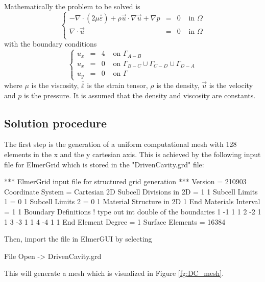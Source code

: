 Mathematically the problem to be solved is
\begin{equation}
\left \{
\begin{array}{rccl}
- \nabla \cdot (2 \mu \overline{\overline{\varepsilon}}) + \rho 
\vec{u} \cdot \nabla \vec{u} + \nabla p & = & 0 & \mbox{ in } \Omega \\
\nabla \cdot \vec{u} & = & 0 & \mbox{ in } \Omega \\
\end{array}
\right .
\end{equation}
%
with the boundary conditions
\begin{equation}
\left \{
\begin{array}{rccl}
u_x & = & 4 	 & \mbox{ on } \Gamma_{A-B} \\
u_x & = & 0 & \mbox{ on } \Gamma_{B-C} \cup \Gamma_{C-D} \cup \Gamma_{D-A} \\
u_y & = & 0 & \mbox{ on } \Gamma  
\end{array}
\right .
\end{equation}
where $\mu$ is the viscosity, $\overline{\overline{\varepsilon}}$ is 
the strain tensor,  $\rho$ is the density, $\vec{u}$ is the velocity and
$p$ is the pressure. It is assumed that the density and viscosity are 
constants. 

\subsection*{Solution procedure}

The first step is the generation of a uniform computational mesh with 128 elements in the x and the y cartesian axis. This is achieved by the following input file for ElmerGrid which is stored in the "DrivenCavity.grd" file:

\ttbegin
*** ElmerGrid input file for structured grid generation ***
Version = 210903
Coordinate System = Cartesian 2D
Subcell Divisions in 2D = 1 1
Subcell Limits 1 = 0 1
Subcell Limits 2 = 0 1
Material Structure in 2D
  1
End
Materials Interval = 1 1
Boundary Definitions
! type out int double of the boundaries
  1     -1   1   1
  2     -2   1   1
  3     -3   1   1
  4     -4   1   1
End
Element Degree = 1
Surface Elements = 16384
\ttend

Then, import the file in ElmerGUI by selecting

\ttbegin
File
  Open -> DrivenCavity.grd
\ttend

This will generate a mesh which is visualized in Figure \ref{fg:DC_mesh}.

